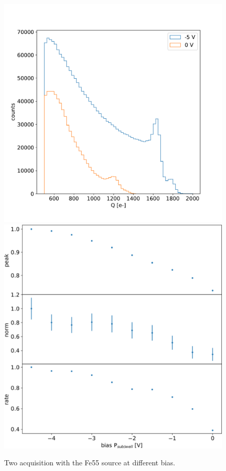         \begin{figure}[h!]
            \centering
            \includegraphics[width=.60\linewidth]{figures/charaterization/Fe_spectrum_bias.pdf}
            \includegraphics[width=.70\linewidth]{figures/charaterization/Fe_param_vs_bias.pdf}
            \caption{Two acquisition with the Fe55 source at different bias. }
            \label{fig:Fe_param_vs_bias}
        \end{figure}     



